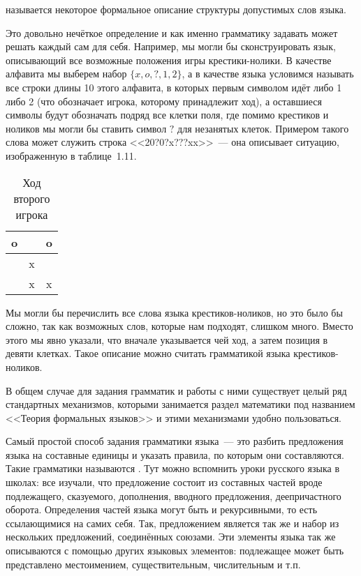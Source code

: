 \begin{definition}
 называется некоторое формальное описание структуры допустимых слов языка.
\end{definition}

Это довольно нечёткое определение и как именно грамматику задавать может решать каждый сам для себя. Например, мы могли бы сконструировать язык, описывающий все возможные положения игры крестики-нолики. В качестве алфавита мы выберем набор $\{x, o, ?,1, 2\}$, а в качестве языка условимся называть все строки длины 10 этого алфавита, в которых первым символом идёт либо 1 либо 2 (что обозначает игрока, которому принадлежит ход), а оставшиеся символы будут обозначать подряд все клетки поля, где помимо крестиков и ноликов мы могли бы ставить символ $?$ для незанятых клеток. Примером такого слова может служить строка <<20?0?x???xx>>~--- она описывает ситуацию, изображенную в таблице~1.11.

\begin{table}[h]
\centering
\begin{tabular}{c | c | c}
o & & o\\
\hline
  & x & \\
\hline
 & x & x
\end{tabular}
\caption{Ход второго игрока}
\end{table}

Мы могли бы перечислить все слова языка крестиков-ноликов, но это было бы сложно, так как возможных слов, которые нам подходят, слишком много. Вместо этого мы явно указали, что вначале указывается чей ход, а затем позиция в девяти клетках. Такое описание можно считать грамматикой языка крестиков-ноликов.

В общем случае для задания грамматик и работы с ними существует целый ряд стандартных механизмов, которыми занимается раздел математики под названием <<Теория формальных языков>> и этими механизмами удобно пользоваться.

Самый простой способ задания грамматики языка~--- это разбить предложения языка на составные единицы и указать правила, по которым они составляются. Такие грамматики называются . Тут можно вспомнить уроки русского языка в школах: все изучали, что предложение состоит из составных частей вроде подлежащего, сказуемого, дополнения, вводного предложения, деепричастного оборота. Определения частей языка могут быть и рекурсивными, то есть ссылающимися на самих себя. Так, предложением является так же и набор из нескольких предложений, соединённых союзами. Эти элементы языка так же описываются с помощью других языковых элементов: подлежащее может быть представлено местоимением, существительным, числительным и т.п.

